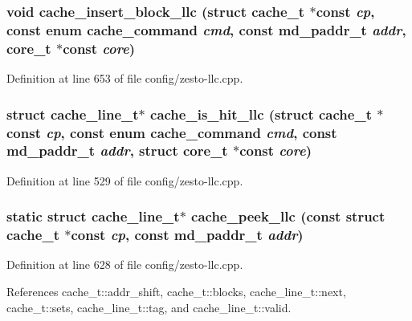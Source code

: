 \subsubsection[{cache\_\-insert\_\-block\_\-llc}]{\setlength{\rightskip}{0pt plus 5cm}void cache\_\-insert\_\-block\_\-llc (struct {\bf cache\_\-t} $\ast$const  {\em cp}, \/  const enum {\bf cache\_\-command} {\em cmd}, \/  const {\bf md\_\-paddr\_\-t} {\em addr}, \/  {\bf core\_\-t} $\ast$const  {\em core})}\label{config_2zesto-llc_8cpp_e7c14fa8601433a16fa1cd5f91e64c7c}




Definition at line 653 of file config/zesto-llc.cpp.
\subsubsection[{cache\_\-is\_\-hit\_\-llc}]{\setlength{\rightskip}{0pt plus 5cm}struct {\bf cache\_\-line\_\-t}$\ast$ cache\_\-is\_\-hit\_\-llc (struct {\bf cache\_\-t} $\ast$const  {\em cp}, \/  const enum {\bf cache\_\-command} {\em cmd}, \/  const {\bf md\_\-paddr\_\-t} {\em addr}, \/  struct {\bf core\_\-t} $\ast$const  {\em core})\hspace{0.3cm}{\tt  [read]}}\label{config_2zesto-llc_8cpp_4c8a74cb2e996679500e5a9adb9efb5c}




Definition at line 529 of file config/zesto-llc.cpp.
\subsubsection[{cache\_\-peek\_\-llc}]{\setlength{\rightskip}{0pt plus 5cm}static struct {\bf cache\_\-line\_\-t}$\ast$ cache\_\-peek\_\-llc (const struct {\bf cache\_\-t} $\ast$const  {\em cp}, \/  const {\bf md\_\-paddr\_\-t} {\em addr})\hspace{0.3cm}{\tt  [static, read]}}\label{config_2zesto-llc_8cpp_955da6a438bbb3f390d758f2f75fa822}




Definition at line 628 of file config/zesto-llc.cpp.

References cache\_\-t::addr\_\-shift, cache\_\-t::blocks, cache\_\-line\_\-t::next, cache\_\-t::sets, cache\_\-line\_\-t::tag, and cache\_\-line\_\-t::valid.


